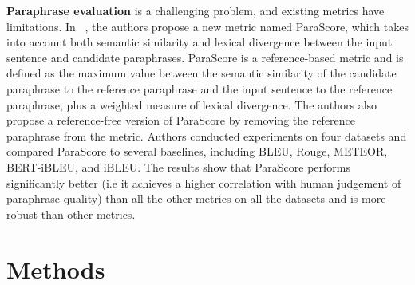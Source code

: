 \documentclass[fleqn,moreauthors,10pt]{ds_report}
\begin{document}
\textbf{Paraphrase evaluation} is a challenging problem, and existing metrics have limitations. In ~\cite{evaluation-metrics-in-paraphrase-generation}, the authors propose a new metric named ParaScore, which takes into account both semantic similarity and lexical divergence between the input sentence and candidate paraphrases. ParaScore is a reference-based metric and is defined as the maximum value between the semantic similarity of the candidate paraphrase to the reference paraphrase and the input sentence to the reference paraphrase, plus a weighted measure of lexical divergence. The authors also propose a reference-free version of ParaScore by removing the reference paraphrase from the metric. Authors conducted experiments on four datasets and compared ParaScore to several baselines, including BLEU, Rouge, METEOR, BERT-iBLEU, and iBLEU. The results show that ParaScore performs significantly better (i.e it achieves a higher correlation with human judgement of paraphrase quality) than all the other metrics on all the datasets and is more robust than other metrics. 





\section*{Methods}

\end{document}
